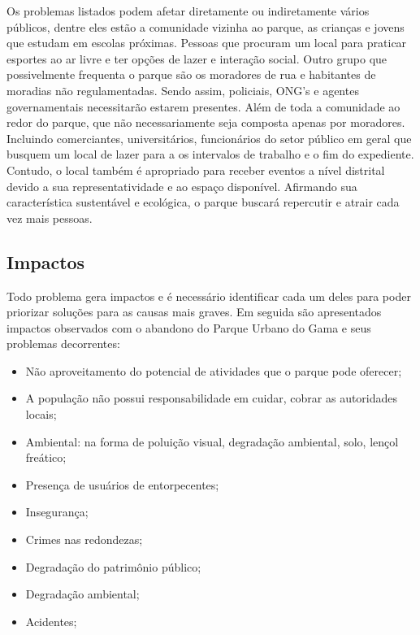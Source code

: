 Os problemas listados podem afetar diretamente ou indiretamente v\'arios p\'ublicos, dentre eles est\~ao a comunidade vizinha ao parque, as crian\c{c}as e jovens que estudam em escolas pr\'oximas. Pessoas que procuram um local para praticar esportes ao ar livre e ter op\c{c}\~oes de lazer e intera\c{c}\~ao social.
	Outro grupo que possivelmente frequenta o parque s\~ao os moradores de rua e habitantes de moradias n\~ao regulamentadas. Sendo assim, policiais, ONG's e agentes governamentais necessitar\~ao estarem presentes.
	Al\'em de toda a comunidade ao redor do parque, que n\~ao necessariamente seja composta apenas por moradores. Incluindo comerciantes, universit\'arios, funcion\'arios do setor p\'ublico em geral que busquem um local de lazer para a os intervalos de trabalho e o fim do expediente.
	Contudo, o local tamb\'em \'e apropriado para receber eventos a n\'ivel distrital devido a sua representatividade e ao espa\c{c}o dispon\'ivel. Afirmando sua caracter\'istica sustent\'avel e ecol\'ogica, o parque buscar\'a repercutir e atrair cada vez mais pessoas.
	
\subsection{Impactos}

Todo problema gera impactos e \'e necess\'ario identificar cada um deles para poder priorizar solu\c{c}\~oes para as causas mais graves. Em seguida s\~ao apresentados impactos observados com o abandono do Parque Urbano do Gama e seus problemas decorrentes:

\begin{itemize}
	\item N\~ao aproveitamento do potencial de atividades que o parque pode oferecer;
	\item A popula\c{c}\~ao n\~ao possui responsabilidade em cuidar, cobrar as autoridades locais;
	\item Ambiental: na forma de polui\c{c}\~ao visual, degrada\c{c}\~ao ambiental, solo, len\c{c}ol fre\'atico;
	\item Presen\c{c}a de usu\'arios de entorpecentes;
	\item Inseguran\c{c}a;
	\item Crimes nas redondezas;
	\item Degrada\c{c}\~ao do patrim\^onio p\'ublico;
	\item Degrada\c{c}\~ao ambiental;
	\item Acidentes;
\end{itemize}

